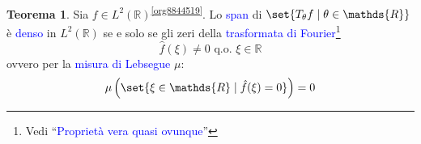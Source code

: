 \documentclass[10pt]{book}
\newcommand{\1}{\mathds{1}}
\newcommand{\R}{\mathds{R}}
\theoremstyle{definition}%
\newtheorem{thm}{Teorema}[section]
\theoremstyle{plain}
\theoremstyle{remark}
\renewcommand{\href}[2]{\textcolor{blue}{#2}}
\begin{document}
\begin{thm}
Sia \(f \in L^{2}(\R)\)\textsuperscript{\ref{org8844519}}. Lo \href{../../../../../org/roam/20250630122400-span.org}{span} di \(\set{T_{\theta}f\mid \theta \in \R}\) è \href{../../../../../org/roam/20250301193045-sottoinsieme_denso.org}{denso} in \(L^{2}(\R)\) se e solo se gli zeri della \href{../../../../../org/roam/20250630121906-trasformata_di_fourier.org}{trasformata di Fourier}\footnote{Vedi ``\href{../../../../../org/roam/20250630122745-proprieta_vera_quasi_ovunque.org}{Proprietà vera quasi ovunque}''}
\begin{equation*}
\hat{f}(\xi) \neq 0\text{ q.o. }\xi \in \R
\end{equation*}
ovvero per la \href{../../../../../org/roam/20250630122824-misura_di_lebesgue.org}{misura di Lebsegue} \(\mu\):
\begin{equation*}
\mu\left(\set{\xi \in \R\mid \hat{f}(\xi) = 0}\right) = 0
\end{equation*}
\label{teo:wt2}
\end{thm}
\end{document}

